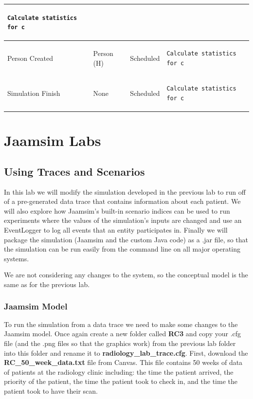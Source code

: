 \documentclass[
  10pt,
  a4paperpaper,
  DIV=11,
  numbers=noendperiod,
  oneside]{scrreprt}
\begin{document}
\begin{longtable}{@{}>{\raggedright\arraybackslash}p{1.5cm}>{\raggedright\arraybackslash}p{2.1cm}>{\raggedright\arraybackslash}p{2.2cm}>{\raggedright\arraybackslash}p{10cm}@{}}
  \begin{lstlisting}[language=CMPseudo]
Calculate statistics for c
  \end{lstlisting}
  \\ \midrule
  Person Created & Person (H)  & Scheduled  & 
  \begin{lstlisting}[language=CMPseudo]
Calculate statistics for c
  \end{lstlisting}
  \\ \midrule
  Simulation Finish & None  & Scheduled  & 
  \begin{lstlisting}[language=CMPseudo]
Calculate statistics for c
  \end{lstlisting}
  \\ \bottomrule
  

\end{longtable}

\part{Jaamsim Labs}

\chapter{Using Traces and Scenarios}\label{using-traces-and-scenarios}

In this lab we will modify the simulation developed in the previous lab
to run off of a pre-generated data trace that contains information about
each patient. We will also explore how Jaamsim's built-in scenario
indices can be used to run experiments where the values of the
simulation's inputs are changed and use an EventLogger to log all events
that an entity participates in. Finally we will package the simulation
(Jaamsim and the custom Java code) as a .jar file, so that the
simulation can be run easily from the command line on all major
operating systems.

We are not considering any changes to the system, so the conceptual
model is the same as for the previous lab.

\section{Jaamsim Model}\label{jaamsim-model}

To run the simulation from a data trace we need to make some changes to
the Jaamsim model. Once again create a new folder called \textbf{RC3}
and copy your .cfg file (and the .png files so that the graphics work)
from the previous lab folder into this folder and rename it to
\textbf{radiology\_lab\_trace.cfg}. First, download the
\textbf{RC\_50\_week\_data.txt} file from Canvas. This file contains 50
weeks of data of patients at the radiology clinic including: the time
the patient arrived, the priority of the patient, the time the patient
took to check in, and the time the patient took to have their scan.
\end{document}
